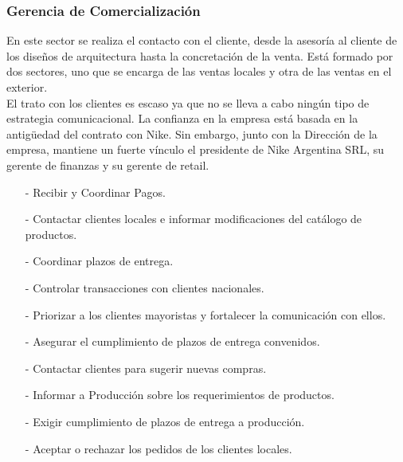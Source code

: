 \documentclass[a4paper,10pt,titlepage]{article}
\begin{document}

\newpage

\subsubsection{Gerencia de Comercializaci\'on}

En este sector se realiza el contacto con el cliente, desde la asesor\'ia al cliente de los dise\~nos de arquitectura 
hasta la concretaci\'on de la venta. Est\'a formado por dos sectores, uno que se encarga de las ventas locales y otra
de las ventas en el exterior.\\
El trato con los clientes es escaso ya que no se lleva a cabo ning\'un tipo de estrategia comunicacional. La confianza 
en la empresa est\'a basada en la antig\"uedad del contrato con Nike. Sin embargo, junto con la Direcci\'on de 
la empresa, mantiene un fuerte v\'inculo el presidente de Nike Argentina SRL, su gerente de finanzas y su gerente de retail.
\smallskip

{
    \begin{itemize}
	\item[-] Recibir y Coordinar Pagos.
	\item[-] Contactar clientes locales e informar modificaciones del cat\'alogo de productos. 
	\item[-] Coordinar plazos de entrega.
	\item[-] Controlar transacciones con clientes nacionales.
    \end{itemize}
}
{
    \begin{itemize}
	\item[-] Priorizar a los clientes mayoristas y fortalecer la comunicaci\'on con ellos.
	\item[-] Asegurar el cumplimiento de plazos de entrega convenidos.
	\item[-] Contactar clientes para sugerir nuevas compras.
	\item[-] Informar a Producci\'on sobre los requerimientos de productos.
    \end{itemize}
}
{
      \begin{itemize}
	\item[-] Exigir cumplimiento de plazos de entrega a producci\'on.
	\item[-] Aceptar o rechazar los pedidos de los clientes locales.
      \end{itemize}
}
\end{document}
